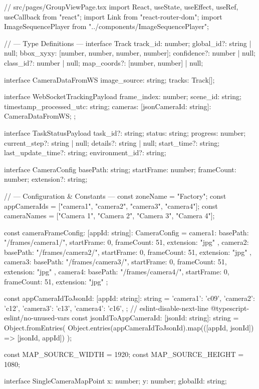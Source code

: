 // src/pages/GroupViewPage.tsx
import React, { useState, useEffect, useRef, useCallback } from "react";
import { Link } from "react-router-dom";
import ImageSequencePlayer from "../components/ImageSequencePlayer";

// --- Type Definitions ---
interface Track {
  track_id: number;
  global_id?: string | null;
  bbox_xyxy: [number, number, number, number];
  confidence?: number | null;
  class_id?: number | null;
  map_coords?: [number, number] | null;
}

interface CameraDataFromWS {
  image_source: string;
  tracks: Track[];
}

interface WebSocketTrackingPayload {
  frame_index: number;
  scene_id: string;
  timestamp_processed_utc: string;
  cameras: {
    [jsonCameraId: string]: CameraDataFromWS;
  };
}

interface TaskStatusPayload {
    task_id?: string;
    status: string;
    progress: number;
    current_step?: string | null;
    details?: string | null;
    start_time?: string;
    last_update_time?: string;
    environment_id?: string;
}

interface CameraConfig {
  basePath: string;
  startFrame: number;
  frameCount: number;
  extension?: string;
}

// --- Configuration & Constants ---
const zoneName = "Factory";
const appCameraIds = ["camera1", "camera2", "camera3", "camera4"];
const cameraNames = ["Camera 1", "Camera 2", "Camera 3", "Camera 4"];

const cameraFrameConfig: { [appId: string]: CameraConfig } = {
  camera1: { basePath: "/frames/camera1/", startFrame: 0, frameCount: 51, extension: "jpg" },
  camera2: { basePath: "/frames/camera2/", startFrame: 0, frameCount: 51, extension: "jpg" },
  camera3: { basePath: "/frames/camera3/", startFrame: 0, frameCount: 51, extension: "jpg" },
  camera4: { basePath: "/frames/camera4/", startFrame: 0, frameCount: 51, extension: "jpg" }
};

const appCameraIdToJsonId: { [appId: string]: string } = {
    'camera1': 'c09',
    'camera2': 'c12',
    'camera3': 'c13',
    'camera4': 'c16',
};
// eslint-disable-next-line @typescript-eslint/no-unused-vars
const jsonIdToAppCameraId: { [jsonId: string]: string } = Object.fromEntries(
  Object.entries(appCameraIdToJsonId).map(([appId, jsonId]) => [jsonId, appId])
);

const MAP_SOURCE_WIDTH = 1920;
const MAP_SOURCE_HEIGHT = 1080;

interface SingleCameraMapPoint {
    x: number;
    y: number;
    globalId: string;
}

